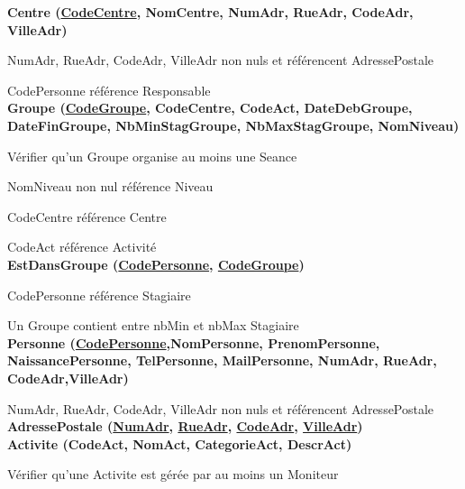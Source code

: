 \documentclass[10pt]{article}
\begin{document}
\begin{small}

\textbf{Centre (\underline{CodeCentre}, NomCentre, NumAdr, RueAdr, CodeAdr, VilleAdr)}

    \hspace{1cm}NumAdr, RueAdr, CodeAdr, VilleAdr non nuls et référencent  AdressePostale
    
    \hspace{1cm}CodePersonne référence Responsable\\

\textbf{Groupe (\underline{CodeGroupe}, CodeCentre, CodeAct, DateDebGroupe, DateFinGroupe, NbMinStagGroupe, NbMaxStagGroupe, NomNiveau)}

    \hspace{1cm}Vérifier qu’un Groupe organise au moins une Seance
    
    \hspace{1cm}NomNiveau non nul référence Niveau
    
    \hspace{1cm}CodeCentre référence Centre
    
    \hspace{1cm}CodeAct référence Activité\\

\textbf{EstDansGroupe (\underline{CodePersonne}, \underline{CodeGroupe})}

    \hspace{1cm}CodePersonne référence Stagiaire
    
    \hspace{1cm}Un Groupe contient entre nbMin et nbMax Stagiaire\\

\textbf{Personne (\underline{CodePersonne},NomPersonne, PrenomPersonne, NaissancePersonne, TelPersonne, MailPersonne, NumAdr, RueAdr, 
CodeAdr,VilleAdr)}

    \hspace{1cm}NumAdr, RueAdr, CodeAdr, VilleAdr non nuls et référencent  AdressePostale\\

\textbf{AdressePostale (\underline{NumAdr}, \underline{RueAdr}, \underline{CodeAdr}, \underline{VilleAdr})}\\

\textbf{Activite (\textbf{CodeAct}, NomAct, CategorieAct, DescrAct)}

    \hspace{1cm}Vérifier qu’une Activite est gérée par au moins un Moniteur
    

\end{small}
\end{document}
